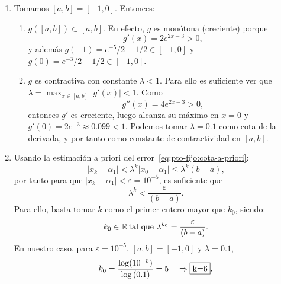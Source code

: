 \begin{EjerciciosResueltos}
\begin{solucion}
\begin{enumerate}
    \item Tomamos $[a,b]=[-1,0]$. Entonces:
      \begin{enumerate}
      \item $g([a,b])\subset [a,b]$. En efecto, $g$ es monótona
        (creciente) porque
        $$
        g'(x)=2e^{2x-3}>0,
        $$
        y además $g(-1)=e^{-5}/2 - 1/2 \in[-1,0]$ y
        $g(0)=e^{-3}/2-1/2 \in [-1,0]$.
      \item $g$ es contractiva con constante $\lambda<1$. Para ello
        es suficiente ver que $\lambda=\max_{x\in[a,b]} |g'(x)|< 1$.
        Como $$g''(x)=4e^{2x-3}>0,$$ entonces $g'$ es creciente,
        luego alcanza su máximo en $x=0$ y
        $g'(0)=2e^{-3} \approx 0.099<1$. Podemos tomar $\lambda=0.1$
        como cota de la derivada, y por tanto como constante de
        contractividad en $[a,b]$.
      \end{enumerate}

    \item
      Usando la estimación a priori del error~\eqref{eq:pto-fijo:cota-a-priori}:
      \begin{equation*}
        |x_k -\alpha_1| < \lambda^k |x_0 - \alpha_1| \le \lambda^k (b-a),
      \end{equation*}
      por tanto para que $|x_k -\alpha_1| < \varepsilon = 10^{-5}$,
      es suficiente que
      \begin{equation*}
        \lambda^k < \frac{\varepsilon}{(b-a)}.
      \end{equation*}
      Para ello, basta tomar $k$ como el primer entero mayor que
      $k_0$, siendo:
      \begin{equation*}
        k_0\in\operatorname{{\mathbb R}} \text{tal que } \lambda^{k_0} = \frac{\varepsilon}{(b-a)}.
      \end{equation*}
      En nuestro caso, para $\varepsilon=10^{-5}$, $[a,b]=[-1,0]$ y
      $\lambda=0.1$,
      \begin{equation*}
        k_0 = \frac{\log(10^{-5})}{\log{(0.1)}}=5 \quad \Rightarrow \fbox{k=6}.
      \end{equation*}


\end{enumerate}
\end{solucion}
\end{EjerciciosResueltos}
